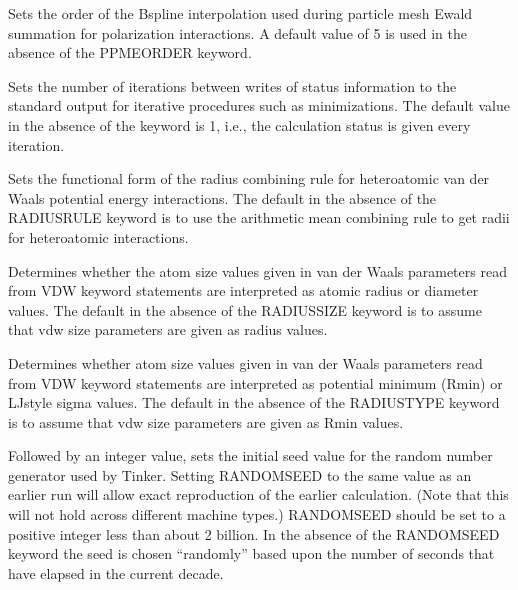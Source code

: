 \documentclass[letterpaper,11pt,english]{sphinxmanual}
\begin{document}





  Sets the order of the B\sphinxhyphen{}spline interpolation used during particle mesh Ewald summation for polarization interactions. A default value of 5 is used in the absence of the PPME\sphinxhyphen{}ORDER keyword.

  Sets the number of iterations between writes of status information to the standard output for iterative procedures such as minimizations. The default value in the absence of the keyword is 1, i.e., the calculation status is given every iteration.

  Sets the functional form of the radius combining rule for heteroatomic van der Waals potential energy interactions. The default in the absence of the RADIUSRULE keyword is to use the arithmetic mean combining rule to get radii for heteroatomic interactions.

  Determines whether the atom size values given in van der Waals parameters read from VDW keyword statements are interpreted as atomic radius or diameter values. The default in the absence of the RADIUSSIZE keyword is to assume that vdw size parameters are given as radius values.

  Determines whether atom size values given in van der Waals parameters read from VDW keyword statements are interpreted as potential minimum (Rmin) or LJ\sphinxhyphen{}style sigma values. The default in the absence of the RADIUSTYPE keyword is to assume that vdw size parameters are given as Rmin values.

  Followed by an integer value, sets the initial seed value for the random number generator used by Tinker. Setting RANDOMSEED to the same value as an earlier run will allow exact reproduction of the earlier calculation. (Note that this will not hold across different machine types.) RANDOMSEED should be set to a positive integer less than about 2 billion. In the absence of the RANDOMSEED keyword the seed is chosen “randomly” based upon the number of seconds that have elapsed in the current decade.
\end{document}
